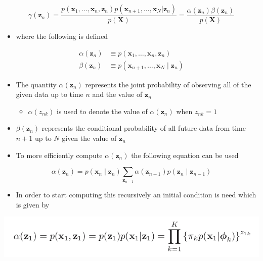 \documentclass[11pt]{article}
\begin{document}
\begin{equation}
  \gamma (\pmb z_n) = \frac{p(\pmb x_1, \dots, \pmb x_n,\pmb z_n)p(\pmb x_{n+1}, \dots, \pmb x_N | \pmb z_n)}{p(\pmb X)} = \frac{\alpha(\pmb z_n)\beta(\pmb z_n)}{p(\pmb X)} 
\end{equation}
\begin{itemize}
\item where the following is defined
\end{itemize}
\begin{equation}
  \begin{split} 
    \alpha (\pmb z_n) &\equiv p(\pmb x_1, \dots, \pmb x_n,\pmb z_n) \\
    \beta (\pmb z_n) &\equiv p(\pmb x_{n+1}, \dots, \pmb x_N \mid \pmb z_n)
  \end{split}
\end{equation}
\begin{itemize}
\item The quantity \(\alpha (\pmb z_n)\) represents the joint probability of observing all of the given data up to time \(n\) and the value of \(\pmb z_n\)
\begin{itemize}
\item \(\alpha(z_{nk})\) is used to denote the value of \(\alpha (\pmb z_n)\) when \(z_{nk}=1\)
\end{itemize}
\item \(\beta (\pmb z_n)\) represents the conditional probability of all future data from time \(n+1\) up to \(N\) given the value of \(\pmb z_n\)

\item To more efficiently compute \(\alpha(\pmb z_n)\) the following equation can be used
\end{itemize}
\begin{equation}
  \alpha(\pmb z_n) = p(\pmb x_n \mid \pmb z_n) \sum_{\pmb z_{n-1}} \alpha (\pmb z_{n-1}) p(\pmb z_n \mid \pmb z_{n-1})
\end{equation}
\begin{itemize}
\item In order to start computing this recursively an initial condition is need which is given by
\end{itemize}
\begin{center}
\includegraphics[width=.9\linewidth]{Sequential Data/screenshot_2018-10-30_10-30-44.png}
\end{center}
\end{document}

